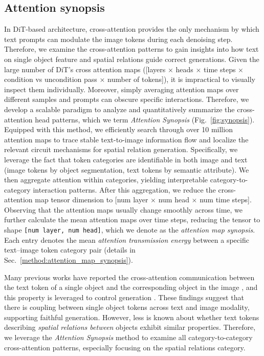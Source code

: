 \subsection{Attention synopsis}
In DiT-based architecture, cross-attention provides the only mechanism by which text prompts can modulate the image tokens during each denoising step. Therefore, we examine the cross-attention patterns to gain insights into how text on single object feature and spatial relations guide correct generations. Given the large number of DiT's cross attention maps ([layers $\times$ heads $\times$ time steps $\times$ condition vs uncondition pass $\times$ number of tokens]), it is impractical to visually inspect them individually. Moreover, simply averaging attention maps over different samples and prompts can obscure specific interactions. Therefore, we develop a scalable paradigm to analyze and quantitatively summarize the cross-attention head patterns, which we term \textit{Attention Synopsis} (Fig.~\ref{fig:synopsis}).
Equipped with this method, we efficiently search through over 10 million attention maps to trace stable text-to-image information flow and localize the relevant circuit mechanisms for spatial relation generation. Specifically, we leverage the fact that token categories are identifiable in both image and text (image tokens by object segmentation, text tokens by semantic attribute). We then aggregate attention within categories, yielding interpretable category-to-category interaction patterns. After this aggregation, we reduce the cross-attention map tensor dimension to [num layer $\times$ num head $\times$ num time steps].
Observing that the attention maps usually change smoothly across time, we further calculate the mean attention maps over time steps, reducing the tensor to shape \texttt{[num layer, num head]}, which we denote as the \textit{attention map synopsis}. Each entry denotes the mean \textit{attention transmission energy} between a specific text--image token category pair (details in Sec.~\ref{method:attention_map_synopsis}).

Many previous works have reported the cross-attention communication between the text token of a single object and the corresponding object in the image \citep{tang2022daam}, and this property is leveraged to control generation \citep{hertz2022crossAttnCtrl,liu_towards_2024}. These findings suggest that there is coupling between single object tokens across text and image modality, supporting faithful generation. However, less is known about whether text tokens describing \textit{spatial relations between} objects exhibit similar properties. Therefore, we leverage the \textit{Attention Synopsis} method to examine all category-to-category cross-attention patterns, especially focusing on the spatial relations category.

